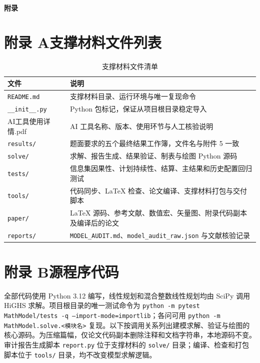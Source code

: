 \newpage
\appendix
\begin{center}
	{\bfseries 附录}
\end{center}

\section*{附录 A\quad 支撑材料文件列表}

\begin{table}[htbp]
	\caption{支撑材料文件清单}
	\centering
	\begin{tabularx}{0.96\textwidth}{l X}
		\toprule
		文件 & 说明 \\
		\midrule
		\texttt{README.md} & 支撑材料目录、运行环境与唯一复现命令 \\
		\texttt{\_\_init\_\_.py} & Python 包标记，保证从项目根目录稳定导入 \\
		AI工具使用详情.pdf & AI 工具名称、版本、使用环节与人工核验说明 \\
		\texttt{results/} & 题面要求的五个最终结果工作簿，文件名与附件 5 一致 \\
		\texttt{solve/} & 求解、报告生成、结果验证、制表与绘图 Python 源码 \\
		\texttt{tests/} & 信息集因果性、计划持续性、结算、主结果和历史配置回归测试 \\
		\texttt{tools/} & 代码同步、LaTeX 检查、论文编译、支撑材料打包与交付脚本 \\
		\texttt{paper/} & LaTeX 源码、参考文献、数值宏、矢量图、附录代码副本及编译后的论文 \\
		\texttt{reports/} & \texttt{MODEL\_AUDIT.md}、\texttt{model\_audit\_raw.json} 与文献核验记录 \\
		\bottomrule
	\end{tabularx}
\end{table}

\section*{附录 B\quad 源程序代码}

全部代码使用 Python 3.12 编写，线性规划和混合整数线性规划均由 SciPy 调用 HiGHS 求解。项目根目录的唯一测试命令为 \texttt{python -m pytest MathModel/tests -q --import-mode=importlib}；各问可用 \texttt{python -m MathModel.solve.<模块名>} 复现。以下按调用关系列出建模求解、验证与绘图的核心源码。为压缩篇幅，仅论文代码副本删除注释和文档字符串，本地源码不变。审计报告生成脚本 \texttt{report.py} 位于支撑材料的 \texttt{solve/} 目录；编译、检查和打包脚本位于 \texttt{tools/} 目录，均不改变模型求解逻辑。


